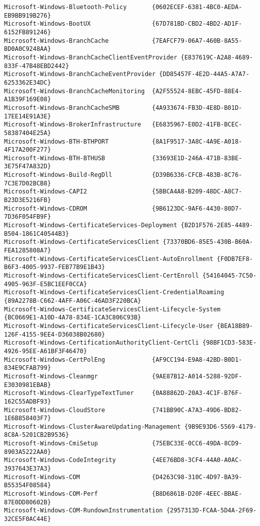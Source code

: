 \documentclass{report}
\begin{document}
\begin{lstlisting}[breaklines=true,basicstyle=\tiny]
Microsoft-Windows-Bluetooth-Policy       {0602ECEF-6381-4BC0-AEDA-EB9BB919B276}
Microsoft-Windows-BootUX                 {67D781BD-CBD2-4BD2-AD1F-6152FB891246}
Microsoft-Windows-BranchCache            {7EAFCF79-06A7-460B-8A55-BD0A0C9248AA}
Microsoft-Windows-BranchCacheClientEventProvider {E837619C-A2A8-4689-833F-47B48EBD2442}
Microsoft-Windows-BranchCacheEventProvider {DD85457F-4E2D-44A5-A7A7-6253362E34DC}
Microsoft-Windows-BranchCacheMonitoring  {A2F55524-8EBC-45FD-88E4-A1B39F169E08}
Microsoft-Windows-BranchCacheSMB         {4A933674-FB3D-4E8D-B01D-17EE14E91A3E}
Microsoft-Windows-BrokerInfrastructure   {E6835967-E0D2-41FB-BCEC-58387404E25A}
Microsoft-Windows-BTH-BTHPORT            {8A1F9517-3A8C-4A9E-A018-4F17A200F277}
Microsoft-Windows-BTH-BTHUSB             {33693E1D-246A-471B-83BE-3E75F47A832D}
Microsoft-Windows-Build-RegDll           {D39B6336-CFCB-483B-8C76-7C3E7D02BCB8}
Microsoft-Windows-CAPI2                  {5BBCA4A8-B209-48DC-A8C7-B23D3E5216FB}
Microsoft-Windows-CDROM                  {9B6123DC-9AF6-4430-80D7-7D36F054FB9F}
Microsoft-Windows-CertificateServices-Deployment {B2D1F576-2E85-4489-B504-1861C40544B3}
Microsoft-Windows-CertificateServicesClient {73370BD6-85E5-430B-B60A-FEA1285808A7}
Microsoft-Windows-CertificateServicesClient-AutoEnrollment {F0DB7EF8-B6F3-4005-9937-FEB77B9E1B43}
Microsoft-Windows-CertificateServicesClient-CertEnroll {54164045-7C50-4905-963F-E5BC1EEF0CCA}
Microsoft-Windows-CertificateServicesClient-CredentialRoaming {89A2278B-C662-4AFF-A06C-46AD3F220BCA}
Microsoft-Windows-CertificateServicesClient-Lifecycle-System {BC0669E1-A10D-4A78-834E-1CA3C806C93B}
Microsoft-Windows-CertificateServicesClient-Lifecycle-User {BEA18B89-126F-4155-9EE4-D36038B02680}
Microsoft-Windows-CertificationAuthorityClient-CertCli {98BF1CD3-583E-4926-95EE-A61BF3F46470}
Microsoft-Windows-CertPolEng             {AF9CC194-E9A8-42BD-B0D1-834E9CFAB799}
Microsoft-Windows-Cleanmgr               {9AE87B12-A014-5288-92DF-E3030981EBAB}
Microsoft-Windows-ClearTypeTextTuner     {0A88862D-20A3-4C1F-B76F-162C55ADBF93}
Microsoft-Windows-CloudStore             {741BB90C-A7A3-49D6-BD82-1E6B858403F7}
Microsoft-Windows-ClusterAwareUpdating-Management {9B9E93D6-5569-4179-8C8A-5201CB2B9536}
Microsoft-Windows-CmiSetup               {75EBC33E-0CC6-49DA-8CD9-8903A5222AA0}
Microsoft-Windows-CodeIntegrity          {4EE76BD8-3CF4-44A0-A0AC-3937643E37A3}
Microsoft-Windows-COM                    {D4263C98-310C-4D97-BA39-B55354F08584}
Microsoft-Windows-COM-Perf               {B8D6861B-D20F-4EEC-BBAE-87E0DD80602B}
Microsoft-Windows-COM-RundownInstrumentation {2957313D-FCAA-5D4A-2F69-32CE5F0AC44E}

\end{lstlisting}
\end{document}
